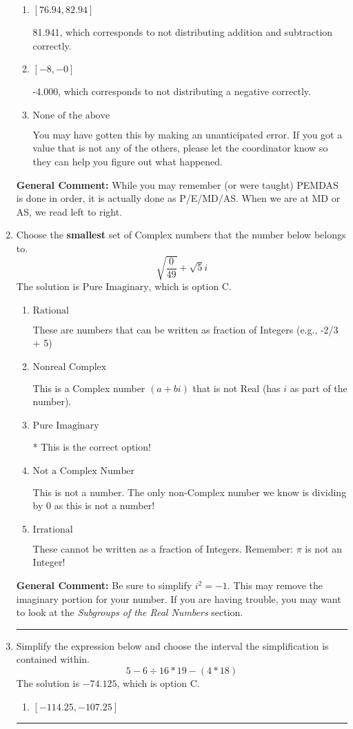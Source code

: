 \documentclass{extbook}[14pt]
\newcommand{\litem}[1]{\item #1

\rule{\textwidth}{0.4pt}}
\begin{document}
\begin{enumerate}
{\begin{enumerate}[label=\Alph*.]
 -48.059, which corresponds to an Order of Operations error: not reading left-to-right for multiplication/division.
\item \( [76.94, 82.94] \)

 81.941, which corresponds to not distributing addition and subtraction correctly.
\item \( [-8, -0] \)

 -4.000, which corresponds to not distributing a negative correctly.
\item \( \text{None of the above} \)

 You may have gotten this by making an unanticipated error. If you got a value that is not any of the others, please let the coordinator know so they can help you figure out what happened.
\end{enumerate}

\textbf{General Comment:} While you may remember (or were taught) PEMDAS is done in order, it is actually done as P/E/MD/AS. When we are at MD or AS, we read left to right.
}
\litem{
Choose the \textbf{smallest} set of Complex numbers that the number below belongs to.
\[ \sqrt{\frac{0}{49}}+\sqrt{5}i \]The solution is \( \text{Pure Imaginary} \), which is option C.\begin{enumerate}[label=\Alph*.]
\item \( \text{Rational} \)

These are numbers that can be written as fraction of Integers (e.g., -2/3 + 5)
\item \( \text{Nonreal Complex} \)

This is a Complex number $(a+bi)$ that is not Real (has $i$ as part of the number).
\item \( \text{Pure Imaginary} \)

* This is the correct option!
\item \( \text{Not a Complex Number} \)

This is not a number. The only non-Complex number we know is dividing by 0 as this is not a number!
\item \( \text{Irrational} \)

These cannot be written as a fraction of Integers. Remember: $\pi$ is not an Integer!
\end{enumerate}

\textbf{General Comment:} Be sure to simplify $i^2 = -1$. This may remove the imaginary portion for your number. If you are having trouble, you may want to look at the \textit{Subgroups of the Real Numbers} section.
}
\litem{
Simplify the expression below and choose the interval the simplification is contained within.
\[ 5 - 6 \div 16 * 19 - (4 * 18) \]The solution is \( -74.125 \), which is option C.\begin{enumerate}[label=\Alph*.]
\item \( [-114.25, -107.25] \)


\end{enumerate}}
\end{enumerate}
\end{document}
